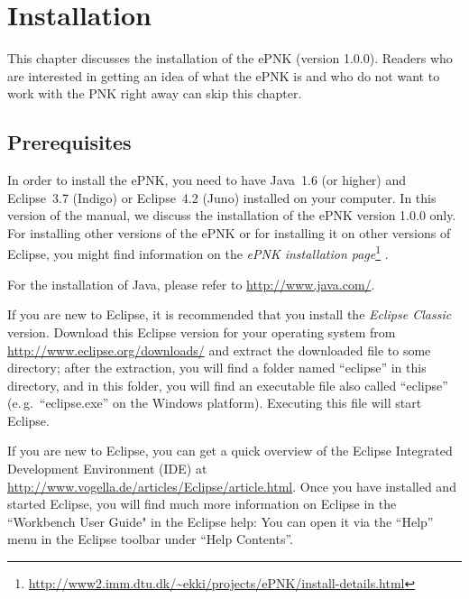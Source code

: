 
\chapter{Installation}
\label{chap:install}


This chapter discusses the installation of the ePNK (version 1.0.0). Readers who
are interested in getting an idea of what the ePNK is and who do not want to
work with the PNK right away can skip this chapter.

\section{Prerequisites}
In order to install the ePNK, you need to have Java~1.6 (or higher)
and Eclipse~3.7 (Indigo) or Eclipse~4.2 (Juno) installed on your computer.
In this version of the manual, we discuss the installation of the ePNK 
version 1.0.0 only. For installing other versions of the ePNK or for
installing it on other versions of Eclipse, you might find information
on the \emph{ePNK installation page}\footnote
  {\url{http://www2.imm.dtu.dk/~ekki/projects/ePNK/install-details.html}}%
.

For the installation of Java, please refer to \url{http://www.java.com/}.


If you are new to Eclipse, it is recommended that you install the \emph{Eclipse
Classic} version.%
Download this Eclipse version for your operating
system from \url{http://www.eclipse.org/downloads/} and extract the
downloaded file to some directory; after the extraction,  you will find a folder
named ``eclipse'' in this directory, and in this folder, you will find an
executable file also called ``eclipse'' (e.\,g.\ ``eclipse.exe'' on the Windows platform). 
Executing this file will start Eclipse.

If you are new to Eclipse, you can get a quick overview of the
Eclipse Integrated Development Environment (IDE) at%
\url{http://www.vogella.de/articles/Eclipse/article.html}. Once you have
installed and started Eclipse, you will find much more information on
Eclipse in the ``Workbench User Guide" in the Eclipse help: You can open it
via the ``Help'' menu in the Eclipse toolbar under ``Help Contents''.


